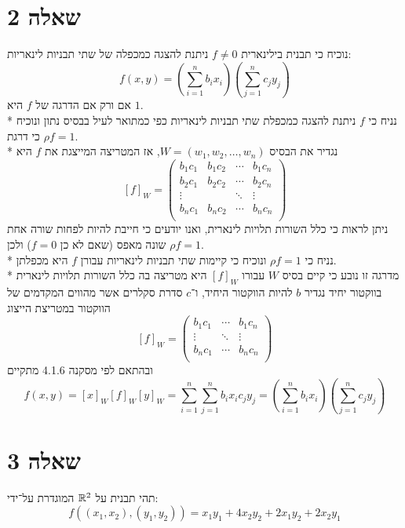 \section{שאלה 2}
נוכיח כי תבנית בילינארית $f \ne 0$ ניתנת להצגה כמכפלה של שתי תבניות לינאריות:
\[
	f(x, y) = \left( \sum_{i = 1}^n b_i x_i \right) \left(\sum_{j = 1}^n c_j y_j \right)
\]
אם ורק אם הדרגה של $f$ היא $1$. \\*
נניח כי $f$ ניתנת להצגה כמכפלת שתי תבניות לינאריות כפי כמתואר לעיל בבסיס נתון ונוכיח כי דרגת $\rho f = 1$. \\*
נגדיר את הבסיס $W = (w_1, w_2, \hdots, w_n)$, אז המטריצה המייצגת את $f$ היא
\[
	[f]_W = \begin{pmatrix}
		b_1 c_1 & b_1 c_2 & \cdots & b_1 c_n \\
		b_2 c_1 & b_2 c_2 & \cdots & b_2 c_n \\
		\vdots & & \ddots & \vdots \\
		b_n c_1 & b_n c_2 & \cdots & b_n c_n \\
	\end{pmatrix}
\]
ניתן לראות כי כלל השורות תלויות לינארית, ואנו יודעים כי חייבת להיות לפחות שורה אחת שונה מאפס (שאם לא כן $f = 0$) ולכן $\rho f = 1$. \\*
נניח כי $\rho f = 1$ ונוכיח כי קיימות שתי תבניות לינאריות עבורן $f$ היא מכפלתן. \\*
מדרגה זו נובע כי קיים בסיס $W$ עבורו $[f]_W$ היא מטריצה בה כלל השורות תלויות לינארית בווקטור יחיד
נגדיר $b$ להיות הווקטור היחיד, ו־$c$ סדרת סקלרים אשר מהווים המקדמים של הווקטור במטריצת הייצוג
\[
	[f]_W = \begin{pmatrix}
		b_1 c_1 & \cdots & b_1 c_n \\
		\vdots & \ddots & \vdots \\
		b_n c_1 & \cdots & b_n c_n \\
	\end{pmatrix}
\]
ובהתאם לפי מסקנה 4.1.6 מתקיים
\[
	f(x, y)
	= [x]_W [f]_W [y]_W
	= \sum_{i = 1}^n \sum_{j = 1}^n b_i x_i c_j y_j
	= \left( \sum_{i = 1}^n b_i x_i \right) \left(\sum_{j = 1}^n c_j y_j \right)
\]

\section{שאלה 3}
תהי תבנית על $\mathbb{R}^2$ המוגדרת על־ידי:
\[
	f\left( (x_1, x_2), (y_1, y_2) \right) = x_1 y_1 + 4 x_2 y_2 + 2 x_1 y_2 + 2x_2 y_1
\]

